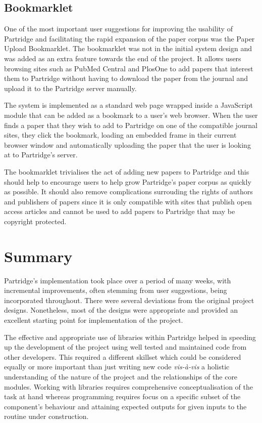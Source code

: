\subsection{ Bookmarklet }

One of the most important user suggestions for improving the usability of
Partridge and facilitating the rapid expansion of the paper corpus was the
Paper Upload Bookmarklet. The bookmarklet was not in the initial system design
and was added as an extra feature towards the end of the project. It allows
users browsing sites such as PubMed Central and PlosOne to add papers that
interest them to Partridge without having to download the paper from the
journal and upload it to the Partridge server manually. 

The system is implemented as a standard web page wrapped inside a JavaScript
module that can be added as a bookmark to a user's web browser. When the user
finds a paper that they wish to add to Partridge on one of the compatible
journal sites, they click the bookmark, loading an embedded frame in their
current browser window and automatically uploading the paper that the user is
looking at to Partridge's server. 

The bookmarklet trivialises the act of adding new papers to Partridge and this
should help to encourage users to help grow Partridge's paper corpus as quickly
as possible. It should also remove complications surrouding the rights of authors and
publishers of papers since it is only compatible with sites that publish open
access articles and cannot be used to add papers to Partridge that may be
copyright protected.

\section{Summary}

Partridge's implementation took place over a period of many weeks, with
incremental improvements, often stemming from user suggestions, being
incorporated throughout. There were several deviations from the original
project designs. Nonetheless, most of the designs were appropriate and provided
an excellent starting point for implementation of the project.

The effective and appropriate use of libraries within Partridge helped in
speeding up the development of the project using well tested and maintained
code from other developers. This required a different skillset which could be
considered equally or more important than just writing new code
\emph{vis-à-vis} a holistic understanding of the nature of the project and the
relationships of the core modules. Working with libraries requires
comprehensive conceptualisation of the task at hand whereas programming
requires focus on a specific subset of the component's behaviour and attaining
expected outputs for given inputs to the routine under construction.
